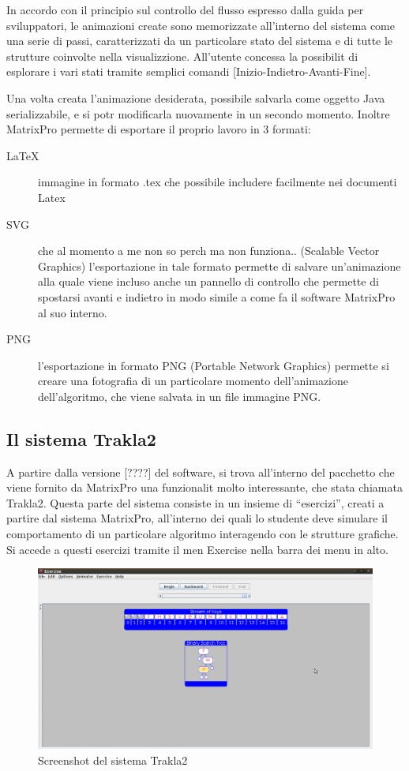 In accordo con il principio sul controllo del flusso espresso dalla
guida per sviluppatori, le animazioni create sono memorizzate all'interno
del sistema come una serie di passi, caratterizzati da un particolare
stato del sistema e di tutte le strutture coinvolte nella visualizzione.
All'utente  concessa la possibilit di esplorare i vari stati tramite
semplici comandi {[}Inizio-Indietro-Avanti-Fine{]}.

Una volta creata l'animazione desiderata,  possibile salvarla come
oggetto Java serializzabile, e si potr modificarla nuovamente in
un secondo momento. Inoltre MatrixPro permette di esportare il proprio
lavoro in 3 formati:
\begin{description}
\item [{\LaTeX{}}] immagine in formato .tex che  possibile includere facilmente
nei documenti Latex 
\item [{SVG}] che al momento a me non so perch ma non funziona.. (Scalable
Vector Graphics) l'esportazione in tale formato permette di salvare
un'animazione alla quale viene incluso anche un pannello di controllo
che permette di spostarsi avanti e indietro in modo simile a come
fa il software MatrixPro al suo interno.
\item [{PNG}] l'esportazione in formato PNG (Portable Network Graphics)
permette si creare una fotografia di un particolare momento dell'animazione
dell'algoritmo, che viene salvata in un file immagine PNG.
\end{description}

\subsection{Il sistema Trakla2}

A partire dalla versione {[}????{]} del software, si trova all'interno
del pacchetto che viene fornito da MatrixPro una funzionalit molto
interessante, che  stata chiamata Trakla2. Questa parte del sistema
consiste in un insieme di {}``esercizi'', creati a partire dal sistema
MatrixPro, all'interno dei quali lo studente deve simulare il comportamento
di un particolare algoritmo interagendo con le strutture grafiche.
Si accede a questi esercizi tramite il men Exercise nella barra dei
menu in alto.

\begin{figure}
\centering
\includegraphics[scale=0.35]{images/trakla_screenshot.png}
\caption{Screenshot del sistema Trakla2}
\end{figure}

